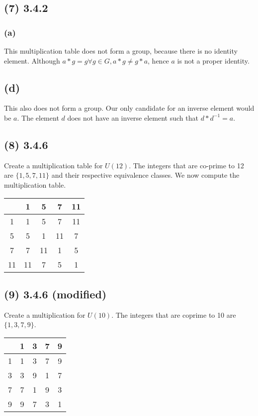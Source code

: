 \documentclass{article}
\begin{document}
\subsection*{(7) 3.4.2}
\subsubsection*{(a)}
This multiplication table does not form a group, because there is no identity element.
Although $a * g = g \forall g \in G, a * g \neq g * a$, hence $a$ is not a proper identity.
\subsection*{(d)}
This also does not form a group.
Our only candidate for an inverse element would be $a$.
The element $d$ does not have an inverse element such that $d * d^{-1} = a$.
\subsection*{(8) 3.4.6}
Create a multiplication table for $U(12)$.
The integers that are co-prime to 12 are $\{1, 5, 7, 11\}$ and their respective equivalence classes.
We now compute the multiplication table.
\begin{center}
    \begin{tabular}{ c| c | c | c | c |}
        & 1 & 5 & 7 & 11 \\
       \hline
       1 & 1 & 5 & 7 & 11 \\ 
       \hline
       5 & 5 & 1 & 11 & 7 \\ 
       \hline
       7 & 7 & 11 & 1 & 5 \\ 
       \hline
       11 & 11 & 7 & 5 & 1 \\ 
       \hline
    \end{tabular}
\end{center}
\subsection*{(9) 3.4.6 (modified)}
Create a multiplication for $U(10)$.
The integers that are coprime to 10 are $\{1, 3, 7, 9\}$.
\begin{center}
    \begin{tabular}{ c| c | c | c | c |}
        & 1 & 3 & 7 & 9 \\
       \hline
       1 & 1 & 3 & 7 & 9 \\ 
       \hline
       3 & 3 & 9 & 1 & 7 \\ 
       \hline
       7 & 7 & 1 & 9 & 3 \\ 
       \hline
       9 & 9 & 7 & 3 & 1 \\ 
       \hline
    \end{tabular}
\end{center}
\end{document}

